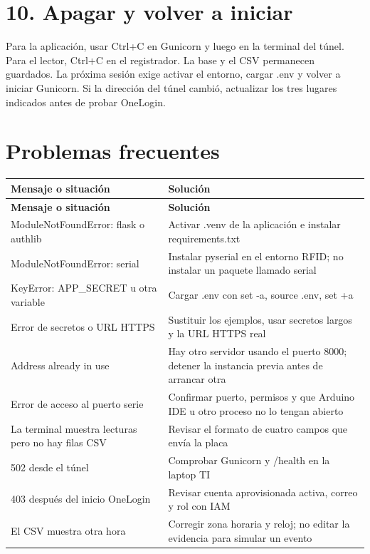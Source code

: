 \documentclass[12pt,a4paper]{article}
\begin{document}
\section*{10. Apagar y volver a iniciar}
Para la aplicación, usar Ctrl+C en Gunicorn y luego en la terminal del túnel. Para el lector, Ctrl+C en el registrador. La base y el CSV permanecen guardados. La próxima sesión exige activar el entorno, cargar \textnormal{.env} y volver a iniciar Gunicorn. Si la dirección del túnel cambió, actualizar los tres lugares indicados antes de probar OneLogin.\par
{}\section*{Problemas frecuentes}
{\small\renewcommand{\arraystretch}{1.2}
\begin{longtable}{p{7.760cm}p{7.760cm}}
\toprule
\textbf{Mensaje o situación} & \textbf{Solución} \\ \midrule\endfirsthead
\textbf{Mensaje o situación} & \textbf{Solución} \\ \midrule\endhead
\textnormal{ModuleNotFoundError: flask} o \textnormal{authlib} & Activar \textnormal{.venv} de la aplicación e instalar \textnormal{requirements.txt} \\
\textnormal{ModuleNotFoundError: serial} & Instalar \textnormal{pyserial} en el entorno RFID; no instalar un paquete llamado \textnormal{serial} \\
\textnormal{KeyError: APP\_\allowbreak{}SECRET} u otra variable & Cargar \textnormal{.env} con \textnormal{set -a}, \textnormal{source .env}, \textnormal{set +a} \\
Error de secretos o URL HTTPS & Sustituir los ejemplos, usar secretos largos y la URL HTTPS real \\
\textnormal{Address already in use} & Hay otro servidor usando el puerto 8000; detener la instancia previa antes de arrancar otra \\
Error de acceso al puerto serie & Confirmar puerto, permisos y que Arduino IDE u otro proceso no lo tengan abierto \\
La terminal muestra lecturas pero no hay filas CSV & Revisar el formato de cuatro campos que envía la placa \\
502 desde el túnel & Comprobar Gunicorn y \textnormal{/\allowbreak{}health} en la laptop TI \\
403 después del inicio OneLogin & Revisar cuenta aprovisionada activa, correo y rol con IAM \\
El CSV muestra otra hora & Corregir zona horaria y reloj; no editar la evidencia para simular un evento \\
\bottomrule\end{longtable}}
\end{document}
